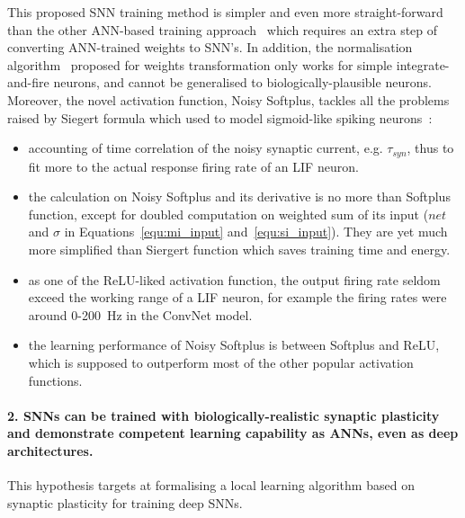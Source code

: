 This proposed SNN training method is simpler and even more straight-forward than the other ANN-based training approach~\cite{cao2015spiking,diehl2015fast} which requires an extra step of converting ANN-trained weights to SNN's.
In addition, the normalisation algorithm~\cite{diehl2015fast} proposed for weights transformation only works for simple integrate-and-fire neurons, and cannot be generalised to biologically-plausible neurons.
Moreover, the novel activation function, Noisy Softplus, tackles all the problems raised by Siegert formula which used to model sigmoid-like spiking neurons~\cite{Jug_etal_2012}: 
	\begin{itemize}
		\item accounting of time correlation of the noisy synaptic current, e.g. $\tau_{syn}$, thus to fit more to the actual response firing rate of an LIF neuron. %
		
		
		\item the calculation on Noisy Softplus and its derivative is no more than Softplus function, except for doubled computation on weighted sum of its input ($net$ and $\sigma$ in Equations~\ref{equ:mi_input} and~\ref{equ:si_input}).
		They are yet much more simplified than Siergert function which saves training time and energy.
		
		\item as one of the ReLU-liked activation function, the output firing rate seldom exceed the working range of a LIF neuron, for example the firing rates were around 0-200~Hz in the ConvNet model.
		
		\item the learning performance of Noisy Softplus is between Softplus and ReLU, which is supposed to outperform most of the other popular activation functions.
	\end{itemize}

\paragraph{2. SNNs can be trained with biologically-realistic synaptic plasticity and demonstrate competent learning capability as ANNs, even as deep architectures.}
This hypothesis targets at formalising a local learning algorithm based on synaptic plasticity for training deep SNNs.

